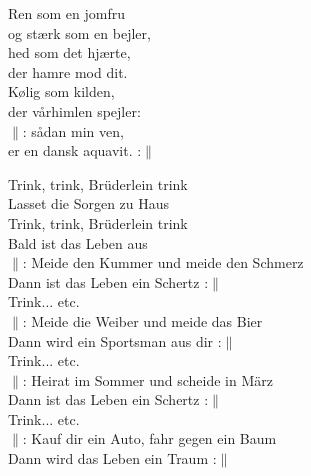 \documentclass[a6paper, 10pt, twoside]{article}
\begin{document}
\noindent
\begin{center}
\end{center}
\begin{lyrics}
Ren som en jomfru\\
og stærk som en bejler,\\
hed som det hjærte,\\
der hamre mod dit.
\vspace{5pt}\\
Kølig som kilden,\\
der vårhimlen spejler:\\
$\|$: sådan min ven,\\
er en dansk aquavit. :$\|$ 
\end{lyrics}
\begin{center}
\end{center}
\begin{lyrics}
Trink, trink, Brüderlein trink\\
Lasset die Sorgen zu Haus\\
Trink, trink, Brüderlein trink\\
Bald ist das Leben aus
\vspace{5pt}\\
$\|$: Meide den Kummer und meide den Schmerz\\
Dann ist das Leben ein Schertz :$\|$
\vspace{5pt}\\
Trink... etc.
\vspace{5pt}\\
$\|$: Meide die Weiber und meide das Bier\\
Dann wird ein Sportsman aus dir :$\|$
\vspace{5pt}\\
Trink... etc.
\vspace{5pt}\\
$\|$: Heirat im Sommer und scheide in März\\
Dann ist das Leben ein Schertz :$\|$
\vspace{5pt}\\
Trink... etc.
\vspace{5pt}\\
$\|$: Kauf dir ein Auto, fahr gegen ein Baum\\
Dann wird das Leben ein Traum :$\|$
\end{lyrics}
\noindent
\end{document}
